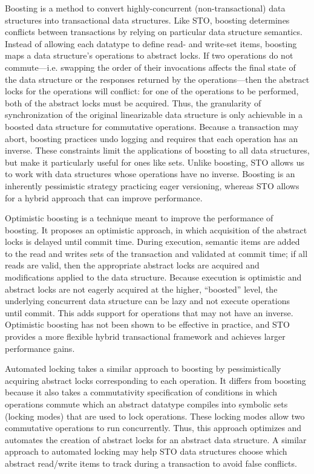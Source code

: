 Boosting\cite{boost} is a method to convert highly-concurrent (non-transactional) data structures into transactional data structures. Like STO, boosting determines conflicts between transactions by relying on particular data structure semantics. Instead of allowing each datatype to define read- and write-set items, boosting maps a data structure's operations to abstract locks. If two operations do not commute---i.e. swapping the order of their invocations affects the final state of the data structure or the responses returned by the operations---then the abstract locks for the operations will conflict: for one of the operations to be performed, both of the abstract locks must be acquired. Thus, the granularity of synchronization of the original linearizable data structure is only achievable in a boosted data structure for commutative operations. Because a transaction may abort, boosting practices undo logging and requires that each operation has an inverse. These constraints limit the applications of boosting to all data structures, but make it particularly useful for ones like sets. Unlike boosting, STO allows us to work with data structures whose operations have no inverse. Boosting is an inherently pessimistic strategy practicing eager versioning, whereas STO allows for a hybrid approach that can improve performance.

Optimistic boosting\cite{optboost} is a technique meant to improve the performance of boosting. It proposes an optimistic approach, in which acquisition of the abstract locks is delayed until commit time. During execution, semantic items are added to the read and writes sets of the transaction and validated at commit time; if all reads are valid, then the appropriate abstract locks are acquired and modifications applied to the data structure. Because execution is optimistic and abstract locks are not eagerly acquired at the higher, ``boosted'' level, the underlying concurrent data structure can be lazy and not execute operations until commit. This adds support for operations that may not have an inverse. 
Optimistic boosting has not been shown to be effective in practice, and STO provides a more flexible hybrid transactional framework and achieves larger performance gains.

Automated locking\cite{autolock} takes a similar approach to boosting by pessimistically acquiring abstract locks corresponding to each operation. It differs from boosting because it also takes a commutativity specification of conditions in which operations commute which an abstract datatype compiles into symbolic sets (locking modes) that are used to lock operations. These locking modes allow two commutative operations to run concurrently. Thus, this approach optimizes and automates the creation of abstract locks for an abstract data structure. A similar approach to automated locking may help STO data structures choose which abstract read/write items to track during a transaction to avoid false conflicts.

